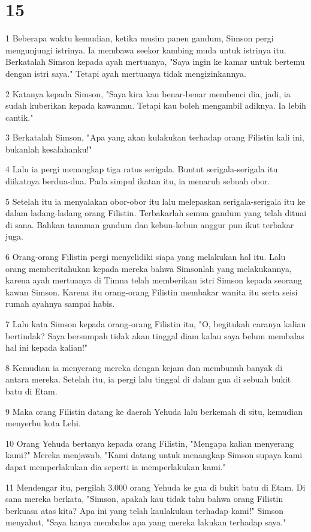 \chapter{15}

\par 1 Beberapa waktu kemudian, ketika musim panen gandum, Simson pergi mengunjungi istrinya. Ia membawa seekor kambing muda untuk istrinya itu. Berkatalah Simson kepada ayah mertuanya, "Saya ingin ke kamar untuk bertemu dengan istri saya." Tetapi ayah mertuanya tidak mengizinkannya.
\par 2 Katanya kepada Simson, "Saya kira kau benar-benar membenci dia, jadi, ia sudah kuberikan kepada kawanmu. Tetapi kau boleh mengambil adiknya. Ia lebih cantik."
\par 3 Berkatalah Simson, "Apa yang akan kulakukan terhadap orang Filistin kali ini, bukanlah kesalahanku!"
\par 4 Lalu ia pergi menangkap tiga ratus serigala. Buntut serigala-serigala itu diikatnya berdua-dua. Pada simpul ikatan itu, ia menaruh sebuah obor.
\par 5 Setelah itu ia menyalakan obor-obor itu lalu melepaskan serigala-serigala itu ke dalam ladang-ladang orang Filistin. Terbakarlah semua gandum yang telah dituai di sana. Bahkan tanaman gandum dan kebun-kebun anggur pun ikut terbakar juga.
\par 6 Orang-orang Filistin pergi menyelidiki siapa yang melakukan hal itu. Lalu orang memberitahukan kepada mereka bahwa Simsonlah yang melakukannya, karena ayah mertuanya di Timna telah memberikan istri Simson kepada seorang kawan Simson. Karena itu orang-orang Filistin membakar wanita itu serta seisi rumah ayahnya sampai habis.
\par 7 Lalu kata Simson kepada orang-orang Filistin itu, "O, begitukah caranya kalian bertindak? Saya bersumpah tidak akan tinggal diam kalau saya belum membalas hal ini kepada kalian!"
\par 8 Kemudian ia menyerang mereka dengan kejam dan membunuh banyak di antara mereka. Setelah itu, ia pergi lalu tinggal di dalam gua di sebuah bukit batu di Etam.
\par 9 Maka orang Filistin datang ke daerah Yehuda lalu berkemah di situ, kemudian menyerbu kota Lehi.
\par 10 Orang Yehuda bertanya kepada orang Filistin, "Mengapa kalian menyerang kami?" Mereka menjawab, "Kami datang untuk menangkap Simson supaya kami dapat memperlakukan dia seperti ia memperlakukan kami."
\par 11 Mendengar itu, pergilah 3.000 orang Yehuda ke gua di bukit batu di Etam. Di sana mereka berkata, "Simson, apakah kau tidak tahu bahwa orang Filistin berkuasa atas kita? Apa ini yang telah kaulakukan terhadap kami!" Simson menyahut, "Saya hanya membalas apa yang mereka lakukan terhadap saya."
